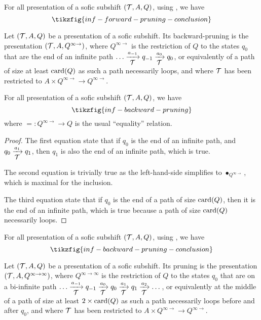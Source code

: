 \begin{corollary}\label{appcor:forward-pruning-inf}
	For all presentation of a sofic subshift $({\mathcal{T}},A,Q)$, using , we have
	\[ \tikzfig{inf-forward-pruning-conclusion}\]
\end{corollary}


\begin{definition}
	Let $({\mathcal{T}},A,Q)$ be a presentation of a sofic subshift. Its backward-pruning is the presentation $({\mathcal{T}},A,Q^{\infty\to})$, where $Q^{\infty\to}$ is the restriction of $Q$ to the states $q_0$ that are the end of an infinite path $\dots \xrightarrow[\text{\small ${\mathcal{T}}$}]{a_{-1}} q_{-1} \xrightarrow[\text{\small ${\mathcal{T}}$}]{a_0} q_0$, or equivalently of a path of size at least $\textup{card}(Q)$ as such a path necessarily loops, and where ${\mathcal{T}}$ has been restricted to $A \times Q^{\infty\to} \to Q^{\infty\to}$.
\end{definition}


\begin{proposition}\label{prop:backward-pruning-inf}
	For all presentation of a sofic subshift $({\mathcal{T}},A,Q)$, we have
	\[ \tikzfig{inf-backward-pruning}\]
	where $= : Q^{\infty \to} \to Q$ is the usual ``equality'' relation.
\end{proposition}
\begin{proof}
	The first equation state that if $q_0$ is the end of an infinite path, and $q_0 \xrightarrow[\text{\small ${\mathcal{T}}$}]{a_{1}} q_1$, then $q_1$ is also the end of an infinite path, which is true.
	
	The second equation is trivially true as the left-hand-side simplifies to $\bullet_{Q^{\infty\to}}$, which is maximal for the inclusion.
	
	The third equation state that if $q_0$ is the end of a path of size $\textup{card}(Q)$, then it is the end of an infinite path, which is true because a path of size $\textup{card}(Q)$ necessarily loops.
\end{proof}

\begin{corollary}\label{appcor:backward-pruning-inf}
	For all presentation of a sofic subshift $({\mathcal{T}},A,Q)$, using , we have
	\[ \tikzfig{inf-backward-pruning-conclusion}\]
\end{corollary}

\begin{definition}[Pruning]
	Let $({\mathcal{T}},A,Q)$ be a presentation of a sofic subshift. Its pruning is the presentation $({\mathcal{T}},A,Q^{\infty\to\infty})$, where $Q^{\infty\to\infty}$ is the restriction of $Q$ to the states $q_0$ that are on a bi-infinite path $\dots \xrightarrow[\text{\small ${\mathcal{T}}$}]{a_{-1}} q_{-1} \xrightarrow[\text{\small ${\mathcal{T}}$}]{a_0} q_0 \xrightarrow[\text{\small ${\mathcal{T}}$}]{a_1} q_1 \xrightarrow[\text{\small ${\mathcal{T}}$}]{a_2} \dots$, or equivalently at the middle of a path of size at least $2 \times \textup{card}(Q)$ as such a path necessarily loops before and after $q_0$, and where ${\mathcal{T}}$ has been restricted to $A \times Q^{\infty\to} \to Q^{\infty\to}$.
\end{definition}

